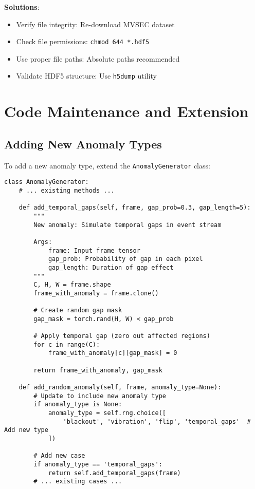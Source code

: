 \documentclass[12pt,a4paper]{article}
\begin{document}
\textbf{Solutions}:
\begin{itemize}
    \item Verify file integrity: Re-download MVSEC dataset
    \item Check file permissions: \texttt{chmod 644 *.hdf5}
    \item Use proper file paths: Absolute paths recommended
    \item Validate HDF5 structure: Use \texttt{h5dump} utility
\end{itemize}

\section{Code Maintenance and Extension}

\subsection{Adding New Anomaly Types}

To add a new anomaly type, extend the \texttt{AnomalyGenerator} class:

\begin{lstlisting}[caption={Adding Custom Anomaly Type}]
class AnomalyGenerator:
    # ... existing methods ...

    def add_temporal_gaps(self, frame, gap_prob=0.3, gap_length=5):
        """
        New anomaly: Simulate temporal gaps in event stream

        Args:
            frame: Input frame tensor
            gap_prob: Probability of gap in each pixel
            gap_length: Duration of gap effect
        """
        C, H, W = frame.shape
        frame_with_anomaly = frame.clone()

        # Create random gap mask
        gap_mask = torch.rand(H, W) < gap_prob

        # Apply temporal gap (zero out affected regions)
        for c in range(C):
            frame_with_anomaly[c][gap_mask] = 0

        return frame_with_anomaly, gap_mask

    def add_random_anomaly(self, frame, anomaly_type=None):
        # Update to include new anomaly type
        if anomaly_type is None:
            anomaly_type = self.rng.choice([
                'blackout', 'vibration', 'flip', 'temporal_gaps'  # Add new type
            ])

        # Add new case
        if anomaly_type == 'temporal_gaps':
            return self.add_temporal_gaps(frame)
        # ... existing cases ...
\end{lstlisting}
\end{document}
